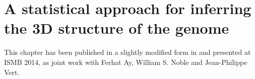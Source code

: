 


\chapter[Inferring the 3D structure of the genome]{A statistical approach for inferring the 3D structure of the genome}
\label{chap:statistical}
\graphicspath{{2_chapter/figures/}}

\begin{work}

This chapter has been published in a slightly modified form in
\citep{varoquaux:statistical} and presented at ISMB 2014, as joint work with
Ferhat Ay, William S. Noble and Jean-Philippe Vert.

\end{work}


